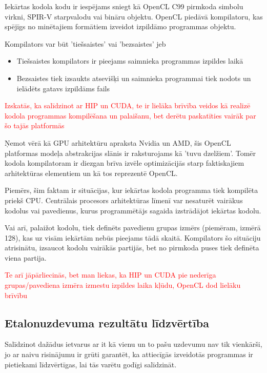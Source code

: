 \documentclass[12pt]{report}%
\theoremstyle{definition}
\begin{document}
Iekārtas kodola kodu ir iespējams sniegt kā OpenCL C99 pirmkoda simbolu virkni, SPIR-V starpvalodu vai bināru objektu.
OpenCL piedāvā kompilatoru, kas spējīgs no minētajiem formātiem izveidot izpildāmo programmas objektu.

Kompilators var būt 'tiešsaistes' vai 'bezsaistes' jeb
\begin{itemize}
    \item Tiešsaistes kompilators ir pieejams saimnieka programmas izpildes laikā
    \item Bezsaistes tiek izsaukts atsevišķi un saimnieka programmai tiek nodots un ielādēts gatavs izpildāms fails 
\end{itemize}

\textcolor{red}{Izskatās, ka salīdzinot ar HIP un CUDA, te ir lielāka brīvība veidos kā realizē kodola programmas kompilēšana un palaišanu, bet derētu paskatīties vairāk par šo tajās platformās}



Ņemot vērā kā GPU arhitektūru apraksta Nvidia un AMD, šis OpenCL platformas modeļa abstrakcijas slānis ir raksturojams kā 'tuvu dzelžiem'.
Tomēr kodola kompilatoram ir diezgan brīva izvēle optimizācijās starp faktiskajiem arhitektūras elementiem un kā tos reprezentē OpenCL.

Piemērs, šim faktam ir situācijas, kur iekārtas kodola programma tiek kompilēta priekš CPU. Centrālais procesors arhitektūras līmenī var nesaturēt
vairākus kodolus vai pavedienus, kurus programmētājs sagaida izstrādājot iekārtas kodolu.

Vai arī, palaižot kodolu, tiek definēts pavedienu grupas izmērs (piemēram, izmērā 128), kas uz visām iekārtām nebūs pieejams tādā skaitā.
Kompilators šo situāciju atrisinātu, izsaucot kodolu vairākās partijās, bet no pirmkoda puses tiek definēta viena partija. 



\textcolor{red}{Te arī jāpārliecinās, bet man liekas, ka HIP un CUDA pie nederīga grupas/pavediena izmēra izmestu izpildes laika kļūdu, OpenCL dod lielāku brīvību}


\begin{center}
    \chapter{Etalonuzdevuma rezultātu līdzvērtība}
\end{center}
Salīdzinot dažādus ietvarus ar it kā vienu un to pašu uzdevumu nav tik vienkārši, jo ar naivu risinājumu ir grūti garantēt,
ka attiecīgās izveidotās programmas ir pietiekami līdzvērtīgas, lai tās varētu godīgi salīdzināt.
\end{document}
